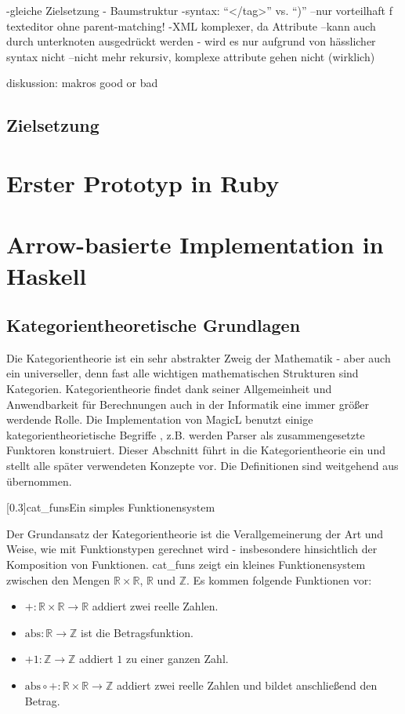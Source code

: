 \documentclass[a4paper, bibgerm]{article}
\newcommand\abb{}
\newcommand\fig{}
\newcommand\ato{\rightarrow}
\begin{document}
-gleiche Zielsetzung - Baumstruktur
-syntax: ``</tag>'' vs. ``)''
--nur vorteilhaft f texteditor ohne parent-matching!
-XML komplexer, da Attribute
--kann auch durch unterknoten ausgedrückt werden - wird es nur aufgrund
von hässlicher syntax nicht
--nicht mehr rekursiv, komplexe attribute gehen nicht (wirklich)

diskussion: makros good or bad

\subsection{Zielsetzung}
\label{sec:intro:goal}

\section{Erster Prototyp in Ruby}
\label{sec:sexy}

\section{Arrow-basierte Implementation in Haskell}
\label{sec:magicl}

\subsection{Kategorientheoretische Grundlagen}
\label{sec:catbasics}

Die Kategorientheorie ist ein sehr abstrakter Zweig der Mathematik -
aber auch ein universeller, denn fast alle wichtigen mathematischen
Strukturen sind Kategorien. Kategorientheorie findet dank seiner
Allgemeinheit und Anwendbarkeit für Berechnungen auch in der Informatik
eine immer größer werdende Rolle. Die Implementation von MagicL benutzt
einige kategorientheorietische Begriffe , z.B. werden Parser als
zusammengesetzte Funktoren konstruiert. Dieser Abschnitt führt in die
Kategorientheorie ein und stellt alle später verwendeten Konzepte
vor. Die Definitionen sind weitgehend aus \cite{Grundlagen} übernommen.

\fig[0.3]{cat_funs}{Ein simples Funktionensystem}

Der Grundansatz der Kategorientheorie ist die Verallgemeinerung der
Art und Weise, wie mit Funktionstypen gerechnet wird - insbesondere
hinsichtlich der Komposition von Funktionen. \abb{cat_funs} zeigt ein
kleines Funktionensystem zwischen den Mengen $\mathbb{R} \times
\mathbb{R}$, $\mathbb{R}$ und $\mathbb{Z}$. Es kommen folgende
Funktionen vor:
\begin{itemize}
\item $+ : \mathbb{R} \times \mathbb{R} \ato \mathbb{R}$ addiert zwei
  reelle Zahlen.
\item $\mathrm{abs} : \mathbb{R} \ato \mathbb{Z}$ ist die Betragsfunktion.
\item $+1 : \mathbb{Z} \ato \mathbb{Z}$ addiert $1$ zu einer ganzen Zahl.
\item $\mathrm{abs} \circ + : \mathbb{R} \times \mathbb{R} \ato \mathbb{Z}$
  addiert zwei reelle Zahlen und bildet anschließend den Betrag.
\end{itemize}
\end{document}
